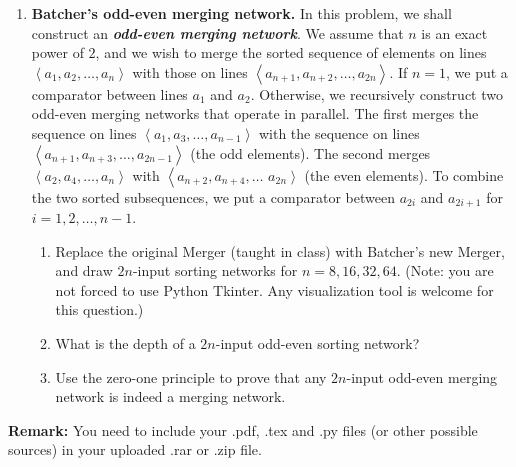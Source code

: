 \documentclass[12pt,a4paper]{article}
\theoremstyle{definition}
\begin{document}
\begin{enumerate}
    \item
    \textbf{Batcher's odd-even merging network.} In this problem, we shall construct an \textbf{\textit{odd-even merging network}}. We assume that $n$ is an exact power of $2$, and we wish to merge the sorted sequence of elements on lines $\left\langle a_{1}, a_{2}, \ldots, a_{n}\right\rangle$ with those on lines $\left\langle a_{n+1}, a_{n+2}, \ldots, a_{2n}\right\rangle .$ If $n=1$, we put a comparator between lines $a_{1}$ and $a_{2}$. Otherwise, we recursively construct two odd-even merging networks that operate in parallel. The first merges the sequence on lines $\left\langle a_{1}, a_{3}, \ldots, a_{n-1}\right\rangle$ with the sequence on lines $\left\langle a_{n+1}, a_{n+3}, \ldots, a_{2n-1}\right\rangle$ (the
    odd elements). The second merges $\left\langle a_{2}, a_{4}, \ldots, a_{n}\right\rangle$ with $\left\langle a_{n+2}, a_{n+4}, \ldots\right.$
    $\left.a_{2n}\right\rangle$ (the even elements). To combine the two sorted subsequences, we put a comparator between $a_{2i}$ and $a_{2i+1}$ for $i=1,2, \ldots, n-1$.
    \begin{enumerate}
    	\item Replace the original Merger (taught in class) with Batcher's new Merger, and draw $2n$-input sorting networks for $n=8, 16, 32, 64$. {\color{blue}(Note: you are not forced to use Python Tkinter. Any visualization tool is welcome for this question.)}
    	
    	\item What is the depth of a $2n$-input odd-even sorting network?
    	
    	\item
    	{\color{red}{(Optional Sub-question with Bonus)}} Use the zero-one principle to prove that any $2n$-input odd-even merging network is indeed a merging network.
    	
    \end{enumerate}

\end{enumerate}

\vspace{20pt}

\textbf{Remark:} You need to include your .pdf, .tex and .py files (or other possible sources) in your uploaded .rar or .zip file.

\end{document}
